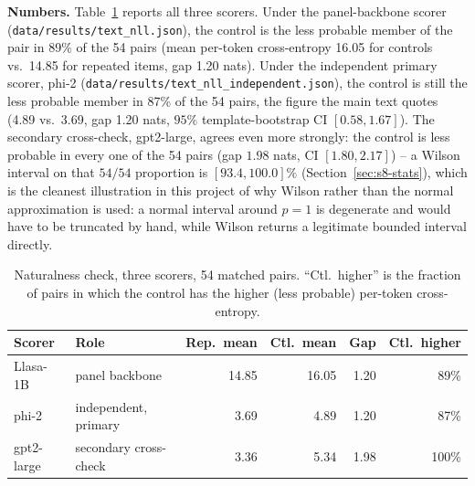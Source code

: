 \documentclass[11pt]{article}
\begin{document}
\textbf{Numbers.} Table~\ref{tab:naturalness} reports all three scorers. Under
the panel-backbone scorer (\texttt{data/results/text\_nll.json}), the control
is the less probable member of the pair in 89\% of the 54
pairs (mean per-token cross-entropy 16.05 for controls vs.\ 14.85 for
repeated items, gap 1.20 nats). Under the independent primary scorer,
phi-2 (\texttt{data/results/text\_nll\_independent.json}), the control is
still the less probable member in 87\% of the 54 pairs, the figure the
main text quotes (4.89 vs.\ 3.69, gap 1.20 nats, $95\%$ template-bootstrap
CI $[0.58, 1.67]$). The secondary cross-check, gpt2-large, agrees even more
strongly: the control is less probable in every one of the 54 pairs (gap
$1.98$ nats, CI $[1.80, 2.17]$) -- a Wilson interval on that $54/54$
proportion is $[93.4, 100.0]\%$ (Section~\ref{sec:s8-stats}), which is the
cleanest illustration in this project of why Wilson rather than the normal
approximation is used: a normal interval around $p=1$ is degenerate and would
have to be truncated by hand, while Wilson returns a legitimate bounded
interval directly.

\begin{table}[h]
\centering
\caption{Naturalness check, three scorers, 54 matched pairs.
``Ctl.\ higher'' is the fraction of pairs in which the control has the
higher (less probable) per-token cross-entropy.}
\label{tab:naturalness}
\small
\begin{tabular}{@{}lp{2.1cm}rrrr@{}}
\toprule
Scorer & Role & Rep.\ mean & Ctl.\ mean & Gap & Ctl.\ higher \\
\midrule
Llasa-1B & panel backbone & 14.85 & 16.05 & 1.20 & 89\% \\
phi-2 & independent, primary & 3.69 & 4.89 & 1.20 & 87\% \\
gpt2-large & secondary cross-check & 3.36 & 5.34 & 1.98 & 100\% \\
\bottomrule
\end{tabular}
\end{table}
\end{document}
